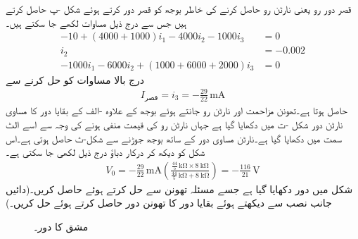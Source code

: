 قصر دور رو یعنی نارٹن رو حاصل کرنے کی خاطر  بوجھ کو قصر دور کرتے ہوئے شکل  -پ  حاصل کرتے ہیں جس سے درج ذیل مساوات لکھے جا سکتے ہیں۔
\begin{align*}
-10+(4000+1000)i_1-4000 i_2 - 1000 i_3&=0\\
i_2&=-0.002\\
-1000 i_1-6000i_2+(1000+6000+2000)i_3&=0
\end{align*} 
درج بالا مساوات کو حل کرنے سے
\begin{align*}
I_{\text{قصر}}=i_3=-\frac{29}{22} \, \si{\milli\ampere}
\end{align*}
حاصل ہوتا ہے۔تھونن مزاحمت اور نارٹن رو جانتے ہوئے    بوجھ کے علاوہ -الف کے بقایا دور کا مساوی نارٹن  دور شکل -ت میں دکھایا گیا ہے جہاں نارٹن رو کی قیمت منفی ہونے کی  وجہ سے اسے الٹ سمت میں دکھایا گیا ہے۔نارٹن مساوی دور کے ساتھ  بوجھ جوڑنے سے شکل-ٹ حاصل ہوتی ہے۔اس شکل کو دیکھ کر درکار دباؤ درج ذیل لکھی جا سکتی ہے۔
\begin{align*}
V_0=-\frac{29}{22}\, \si{\milli\ampere} \left(\frac{\frac{44}{5}\, \si{\kilo\ohm}\times \SI{8}{\kilo\ohm}}{\frac{44}{5}\, \si{\kilo\ohm} + \SI{8}{\kilo\ohm}} \right)=-\frac{116}{21} \, \si{\volt}
\end{align*}
شکل  میں دور دکھایا گیا ہے جسے  مسئلہ تھونن سے حل کرتے ہوئے  حاصل کریں۔(دائیں جانب نصب  سے دیکھتے ہوئے بقایا دور کا تھونن دور حاصل کرتے ہوئے حل کریں۔)
\begin{figure}
\centering
{}
\caption{مشق  کا دور۔}
\label{شکل_مسئلہ_مشق_تھونن_الف}
\end{figure}

